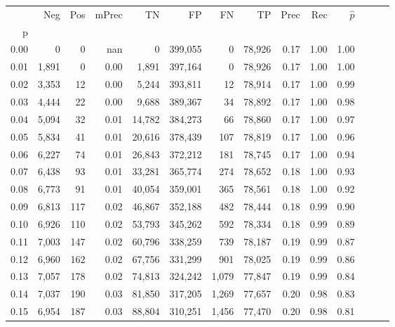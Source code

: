 \begin{tabular}{rrrrrrrrrrrrrr}
\toprule
{} &    Neg &    Pos & mPrec &       TN &       FP &      FN &      TP &  Prec &   Rec & $\hat{p}$ \\
p    &        &        &       &          &          &         &         &       &       &           \\
\midrule
0.00 &      0 &      0 &   nan &        0 &  399,055 &       0 &  78,926 &  0.17 &  1.00 &      1.00 \\
0.01 &  1,891 &      0 &  0.00 &    1,891 &  397,164 &       0 &  78,926 &  0.17 &  1.00 &      1.00 \\
0.02 &  3,353 &     12 &  0.00 &    5,244 &  393,811 &      12 &  78,914 &  0.17 &  1.00 &      0.99 \\
0.03 &  4,444 &     22 &  0.00 &    9,688 &  389,367 &      34 &  78,892 &  0.17 &  1.00 &      0.98 \\
0.04 &  5,094 &     32 &  0.01 &   14,782 &  384,273 &      66 &  78,860 &  0.17 &  1.00 &      0.97 \\
0.05 &  5,834 &     41 &  0.01 &   20,616 &  378,439 &     107 &  78,819 &  0.17 &  1.00 &      0.96 \\
0.06 &  6,227 &     74 &  0.01 &   26,843 &  372,212 &     181 &  78,745 &  0.17 &  1.00 &      0.94 \\
0.07 &  6,438 &     93 &  0.01 &   33,281 &  365,774 &     274 &  78,652 &  0.18 &  1.00 &      0.93 \\
0.08 &  6,773 &     91 &  0.01 &   40,054 &  359,001 &     365 &  78,561 &  0.18 &  1.00 &      0.92 \\
0.09 &  6,813 &    117 &  0.02 &   46,867 &  352,188 &     482 &  78,444 &  0.18 &  0.99 &      0.90 \\
0.10 &  6,926 &    110 &  0.02 &   53,793 &  345,262 &     592 &  78,334 &  0.18 &  0.99 &      0.89 \\
0.11 &  7,003 &    147 &  0.02 &   60,796 &  338,259 &     739 &  78,187 &  0.19 &  0.99 &      0.87 \\
0.12 &  6,960 &    162 &  0.02 &   67,756 &  331,299 &     901 &  78,025 &  0.19 &  0.99 &      0.86 \\
0.13 &  7,057 &    178 &  0.02 &   74,813 &  324,242 &   1,079 &  77,847 &  0.19 &  0.99 &      0.84 \\
0.14 &  7,037 &    190 &  0.03 &   81,850 &  317,205 &   1,269 &  77,657 &  0.20 &  0.98 &      0.83 \\
0.15 &  6,954 &    187 &  0.03 &   88,804 &  310,251 &   1,456 &  77,470 &  0.20 &  0.98 &      0.81 \\

\end{tabular}
